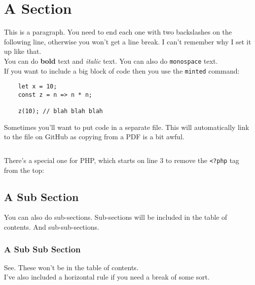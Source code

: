 \section{A Section}

This is a paragraph. You need to end each one with two backslashes on the following line, otherwise you won't get a line break. I can't remember why I set it up like that.
\\

You can do \textbf{bold} text and \textit{italic} text. You can also do \texttt{monospace} text.
\\

If you want to include a big block of code then you use the \texttt{minted} command:

\begin{verbatim}
    let x = 10;
    const z = n => n * n;

    z(10); // blah blah blah
\end{verbatim}

Sometimes you'll want to put code in a separate file. This will automatically link to the file on GitHub as copying from a PDF is a bit awful.

\inputminted{js}{resources/example.js}

\pagebreak

There's a special one for PHP, which starts on line 3 to remove the \texttt{<?php} tag from the top:


\subsection{A Sub Section}

You can also do sub-sections. Sub-sections will be included in the table of contents. And sub-sub-sections.

\subsubsection{A Sub Sub Section}

See. These won't be in the table of contents.
\\

I've also included a horizontal rule if you need a break of some sort.

